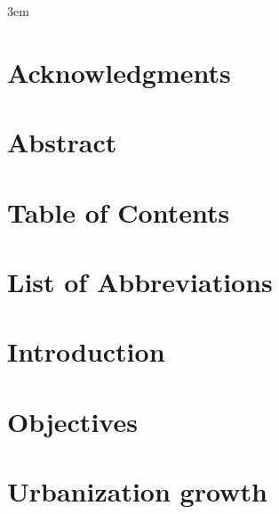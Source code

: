 \documentclass[10pt,twoside]{book}
\begin{document}
\emergencystretch 3em

\frontmatter



\chapter{Acknowledgments}
% 
\clearpage

\chapter{Abstract}
% 
\clearpage

\chapter{Table of Contents}
\tableofcontents %
\clearpage



\chapter{List of Abbreviations}

\clearpage

\mainmatter

\chapter{Introduction}
\clearpage


\clearpage

\chapter{Objectives}
\clearpage

% 
\clearpage

\chapter{Urbanization growth}
\clearpage
\end{document}
